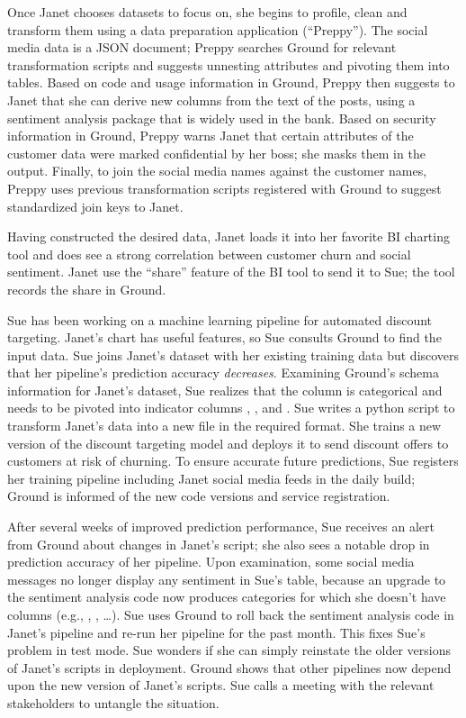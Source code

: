 \documentclass{sig-alternate}
\begin{document}
Once Janet chooses datasets to focus on, she begins to profile, clean and transform them using a data preparation application (``Preppy''). The social media data is a JSON document; Preppy searches Ground for relevant transformation scripts and suggests unnesting attributes and pivoting them into tables.
Based on code and usage information in Ground, Preppy then suggests to Janet that she can derive new columns from the text of the posts, using a sentiment analysis package that is widely used in the bank. 
Based on security information in Ground, Preppy warns Janet that certain attributes of the customer data were marked confidential by her boss; she masks them in the output. 
Finally, to join the social media names against the customer names, Preppy uses previous transformation scripts registered with Ground to suggest standardized join keys to Janet.

Having constructed the desired data, Janet loads it into her favorite BI charting tool and does see a strong correlation between  customer churn and social sentiment. Janet use the ``share'' feature of the BI tool to send it to Sue; the tool records the share in Ground.


Sue has been working on a machine learning pipeline for automated discount targeting. Janet's chart has useful features, so Sue consults Ground to find the input data.
Sue joins Janet's dataset with her existing training data but discovers that her pipeline's prediction accuracy \emph{decreases}.  
Examining Ground's schema information for Janet's dataset, Sue realizes that the  column is categorical and needs to be pivoted into indicator columns , , and . 
Sue writes a python script to transform Janet's data into a new file in the required format.
She trains a new version of the discount targeting model and deploys it to send discount offers to customers at risk of churning.
To ensure accurate future predictions, Sue registers her training pipeline including Janet social media feeds in the daily build; Ground is informed of the new code versions and service registration.

After several weeks of improved prediction performance, Sue receives an alert from Ground about changes in Janet's script; she also sees a notable drop in prediction accuracy of her pipeline. 
Upon examination, some social media messages no longer display any sentiment in Sue's table, because an upgrade to the sentiment analysis code now produces categories for which she doesn't have columns (e.g., , , \ldots).
Sue uses Ground to roll back the sentiment analysis code in Janet's pipeline and re-run her pipeline for the past month.  
This fixes Sue's problem in test mode. 
Sue wonders if she can simply reinstate the older versions of Janet's scripts in deployment. Ground shows that other pipelines now depend upon the new version of Janet's scripts.  Sue calls a meeting with the relevant stakeholders to untangle the situation.
\end{document}
